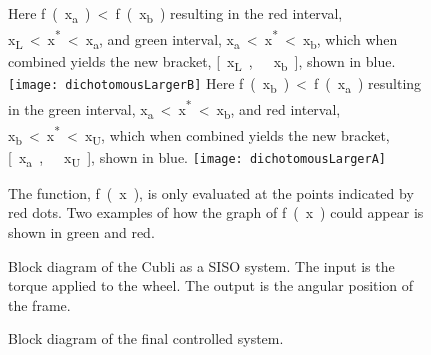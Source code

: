 \begin{figure}[H]
	\begin{minipage}{\linewidth}
		\captionsetup[subfigure]{font = footnotesize}
		\centering
		\subcaptionbox
		{
			Here \si{f(x_a) < f(x_b)} resulting in the red interval, \si{x_{L} < x^* < x_a}, and green interval, \si{x_a < x^* < x_b}, which when combined yields the new bracket, \si{[x_{L},\ x_b]}, shown in blue.
			\label{dichotomousLargerB}
		}
		{
			\texttt{[image: dichotomousLargerB]}
		}\quad
		\subcaptionbox
		{
			Here \si{f(x_b) < f(x_a)} resulting in the green interval, \si{x_a < x^* < x_b}, and red interval, \si{x_b < x^* < x_{U}}, which when combined yields the new bracket, \si{[x_a,\ x_{U}]}, shown in blue.
			\label{dichotomousLargerA}
		}
		{
			\texttt{[image: dichotomousLargerA]}
		}
		\caption{The function, \si{f(x)}, is only evaluated at the points indicated by red dots. Two examples of how the graph of \si{f(x)} could appear is shown in green and red.}
		\label{dichotomousLargerAorB}
	\end{minipage}
\end{figure}\vspace{-18pt}


\begin{figure}[H]
	
	\caption{Block diagram of the Cubli as a SISO system. The input is the torque applied to the wheel. The output is the angular position of the frame.}
	\label{cubliSimulink}
\end{figure}

\begin{figure}[H]
	
	\centering
	\caption{Block diagram of the final controlled system.}
	\label{blockDiagramController}
\end{figure}\vspace{-18pt}